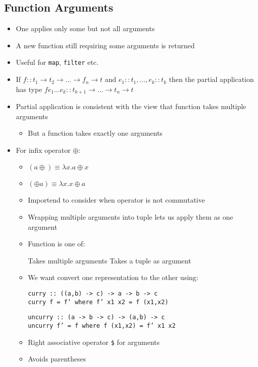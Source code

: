 \subsection{Function Arguments}
\begin{itemize}
    \item One applies only some but not all arguments
    \item A new function still requiring some arguments is returned
    \item Useful for \verb+map+, \verb+filter+ etc.
    \item If $f :: t_1 \to t_2 \to \dots \to f_n \to t$ and $e_1 :: t_1, \dots , e_k :: t_k$ then the partial application has type $f e_1 \dots e_k :: t_{k + 1} \to \dots \to t_n \to t$
    \item Partial application is consistent with the view that function takes multiple arguments
        \begin{itemize}
            \item But a function takes exactly one arguments
        \end{itemize}
    \item For infix operator $\oplus$:
        \begin{itemize}
            \item $(a \oplus) \equiv \lambda x. a \oplus x$
            \item $(\oplus a) \equiv \lambda x. x \oplus a$
            \item Importend to consider when operator is not commutative
        \end{itemize}
        \begin{itemize}
            \item Wrapping multiple arguments into tuple lets us apply them as one argument
            \item Function is one of:
                \begin{itemize}
                     Takes multiple arguments
                     Takes a tuple as argument
                \end{itemize}
            \item We want convert one representation to the other using:
                \begin{itemize}
\begin{verbatim}
curry :: ((a,b) -> c) -> a -> b -> c
curry f = f’ where f’ x1 x2 = f (x1,x2)
\end{verbatim}
\begin{verbatim}
uncurry :: (a -> b -> c) -> (a,b) -> c
uncurry f’ = f where f (x1,x2) = f’ x1 x2
\end{verbatim}
                \end{itemize}
        \end{itemize}
        \begin{itemize}
            \item Right associative operator \verb+$+ for arguments
            \item Avoids parentheses
        \end{itemize}
\end{itemize}
